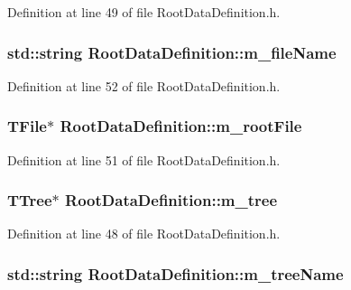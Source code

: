 Definition at line 49 of file Root\+Data\+Definition.\+h.

\hypertarget{classRootDataDefinition_a03154139db8613ec02cd57fd84d8c0e8}{
\subsubsection[{m\+\_\+file\+Name}]{\setlength{\rightskip}{0pt plus 5cm}std\+::string Root\+Data\+Definition\+::m\+\_\+file\+Name\hspace{0.3cm}{\ttfamily [protected]}}}\label{classRootDataDefinition_a03154139db8613ec02cd57fd84d8c0e8}


Definition at line 52 of file Root\+Data\+Definition.\+h.

\hypertarget{classRootDataDefinition_af00a892a1b940abf9265066391b67304}{
\subsubsection[{m\+\_\+root\+File}]{\setlength{\rightskip}{0pt plus 5cm}T\+File$\ast$ Root\+Data\+Definition\+::m\+\_\+root\+File\hspace{0.3cm}{\ttfamily [protected]}}}\label{classRootDataDefinition_af00a892a1b940abf9265066391b67304}


Definition at line 51 of file Root\+Data\+Definition.\+h.

\hypertarget{classRootDataDefinition_a941ec585a2aa533bc30889a382e54f50}{
\subsubsection[{m\+\_\+tree}]{\setlength{\rightskip}{0pt plus 5cm}T\+Tree$\ast$ Root\+Data\+Definition\+::m\+\_\+tree\hspace{0.3cm}{\ttfamily [protected]}}}\label{classRootDataDefinition_a941ec585a2aa533bc30889a382e54f50}


Definition at line 48 of file Root\+Data\+Definition.\+h.

\hypertarget{classRootDataDefinition_a46394bbb1863baa4abcd8cbd0413fa88}{
\subsubsection[{m\+\_\+tree\+Name}]{\setlength{\rightskip}{0pt plus 5cm}std\+::string Root\+Data\+Definition\+::m\+\_\+tree\+Name\hspace{0.3cm}{\ttfamily [protected]}}}\label{classRootDataDefinition_a46394bbb1863baa4abcd8cbd0413fa88}


